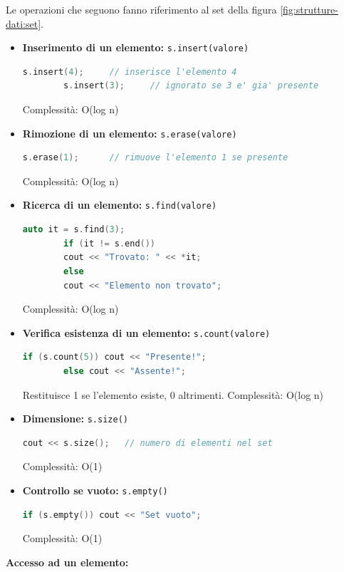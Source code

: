Le operazioni che seguono fanno riferimento al set della figura \ref{fig:strutture-dati:set}.

\begin{itemize}
	
	\item \textbf{Inserimento di un elemento:} \texttt{s.insert(valore)}
	\begin{lstlisting}[language=C++]
		s.insert(4);     // inserisce l'elemento 4
		s.insert(3);     // ignorato se 3 e' gia' presente
	\end{lstlisting}
	Complessità: O(log n)
	
	\item \textbf{Rimozione di un elemento:} \texttt{s.erase(valore)}
	\begin{lstlisting}[language=C++]
		s.erase(1);      // rimuove l'elemento 1 se presente
	\end{lstlisting}
	Complessità: O(log n)
	
	\item \textbf{Ricerca di un elemento:} \texttt{s.find(valore)}
	\begin{lstlisting}[language=C++]
		auto it = s.find(3);
		if (it != s.end())
		cout << "Trovato: " << *it;
		else
		cout << "Elemento non trovato";
	\end{lstlisting}
	Complessità: O(log n)
	
	\item \textbf{Verifica esistenza di un elemento:} \texttt{s.count(valore)}
	\begin{lstlisting}[language=C++]
		if (s.count(5)) cout << "Presente!";
		else cout << "Assente!";
	\end{lstlisting}
	Restituisce 1 se l’elemento esiste, 0 altrimenti.  
	Complessità: O(log n)
	
	\item \textbf{Dimensione:} \texttt{s.size()}
	\begin{lstlisting}[language=C++]
		cout << s.size();   // numero di elementi nel set
	\end{lstlisting}
	Complessità: O(1)
	
	\item \textbf{Controllo se vuoto:} \texttt{s.empty()}
	\begin{lstlisting}[language=C++]
		if (s.empty()) cout << "Set vuoto";
	\end{lstlisting}
	Complessità: O(1)
\end{itemize}

	\item \textbf{Accesso ad un elemento:}
	
